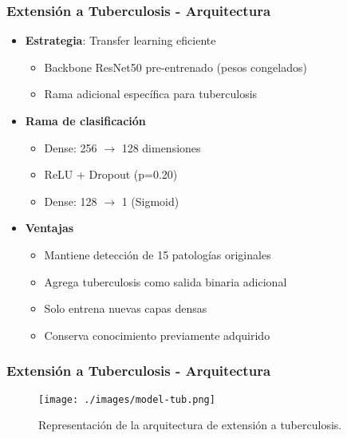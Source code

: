 \begin{frame}
\frametitle{Extensión a Tuberculosis - Arquitectura}
\begin{itemize}
    \item \textbf{Estrategia}: Transfer learning eficiente
    \begin{itemize}
        \item Backbone ResNet50 pre-entrenado (pesos congelados)
        \item Rama adicional específica para tuberculosis
    \end{itemize}
    \item \textbf{Rama de clasificación}
    \begin{itemize}
        \item Dense: 256 $\rightarrow$ 128 dimensiones
        \item ReLU + Dropout (p=0.20)
        \item Dense: 128 $\rightarrow$ 1 (Sigmoid)
    \end{itemize}
    \item \textbf{Ventajas}
    \begin{itemize}
        \item Mantiene detección de 15 patologías originales
        \item Agrega tuberculosis como salida binaria adicional
        \item Solo entrena nuevas capas densas
        \item Conserva conocimiento previamente adquirido
    \end{itemize}
\end{itemize}
\end{frame}

\begin{frame}
\frametitle{Extensión a Tuberculosis - Arquitectura}
\begin{figure}[ht!]
    \centering
    \texttt{[image: ./images/model-tub.png]}
    \caption{Representación de la arquitectura de extensión a tuberculosis.}
\end{figure}
\end{frame}

